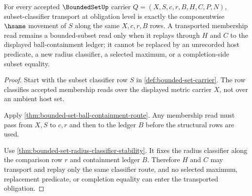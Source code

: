 \begin{theorem}
\label{thm:boundedset-obligation-classifier}
For every accepted $\BoundedSetUp$ carrier $Q=(X,S,c,r,B,H,C,P,N)$, subset-classifier transport at obligation level is exactly the componentwise $\hsame$ movement of $S$ along the same $X,c,r,B$ rows. A transported membership read remains a bounded-subset read only when it replays through $H$ and $C$ to the displayed ball-containment ledger; it cannot be replaced by an unrecorded host predicate, a new radius classifier, a selected maximum, or a completion-side subset equality.
\end{theorem}
\begin{proof}
Start with the subset classifier row $S$ in \autoref{def:bounded-set-carrier}. The row classifies accepted membership reads over the displayed metric carrier $X$, not over an ambient host set.

Apply \autoref{thm:bounded-set-ball-containment-route}. Any membership read must pass from $X,S$ to $c,r$ and then to the ledger $B$ before the structural rows are used.

Use \autoref{thm:bounded-set-radius-classifier-stability}. It fixes the radius classifier along the comparison row $r$ and containment ledger $B$. Therefore $H$ and $C$ may transport and replay only the same classifier route, and no selected maximum, replacement predicate, or completion equality can enter the transported obligation.
\end{proof}

